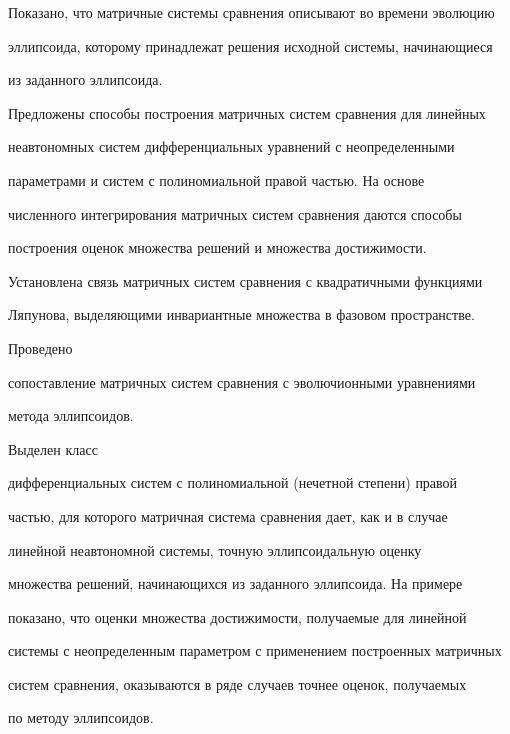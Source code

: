 Показано, что матричные системы сравнения описывают во времени эволюцию 


эллипсоида, которому принадлежат решения исходной системы, начинающиеся


из заданного эллипсоида.


Предложены способы построения матричных систем сравнения для линейных 


неавтономных систем дифференциальных уравнений с неопределенными 


параметрами и систем с полиномиальной правой частью. На основе 


численного интегрирования матричных систем сравнения даются способы 


построения оценок множества решений и множества достижимости. 


 


Установлена связь матричных систем сравнения с квадратичными функциями 


Ляпунова, выделяющими инвариантные множества в фазовом пространстве.


Проведено


сопоставление матричных систем сравнения с эволючионными уравнениями


метода эллипсоидов.


Выделен класс 


дифференциальных систем с полиномиальной (нечетной степени) правой 


частью, для которого матричная система сравнения дает, как и в случае 


линейной неавтономной системы, точную эллипсоидальную оценку 


множества решений, начинающихся из заданного эллипсоида. На примере 


показано, что оценки множества достижимости, получаемые для линейной 


системы с неопределенным параметром с применением построенных матричных 


систем сравнения, оказываются в ряде случаев точнее оценок, получаемых 


по методу эллипсоидов. 


 


